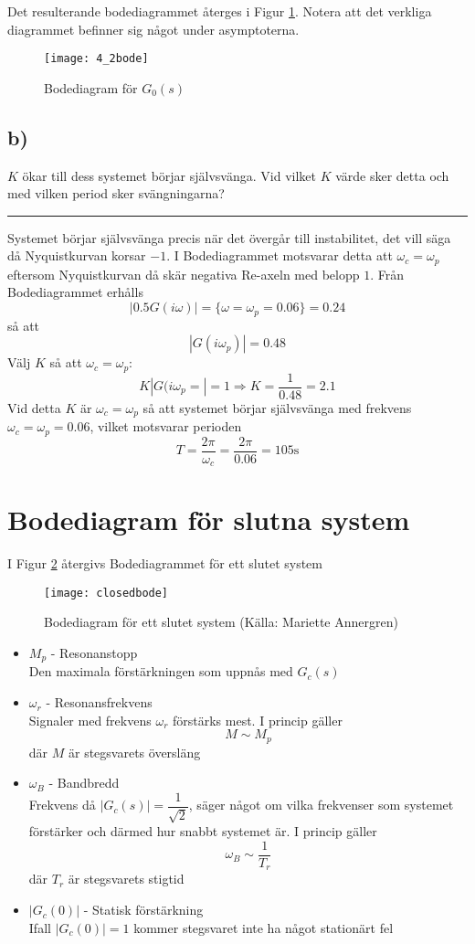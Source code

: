 \documentclass[12pt]{article}
\newcommand{\qline}{\hrule \vspace*{10pt}}
\begin{document}
\FloatBarrier
Det resulterande bodediagrammet återges i Figur \ref{fig:42bode}. Notera att det verkliga diagrammet befinner sig något under asymptoterna.
\begin{figure}[h!]
  \centering
  \texttt{[image: 4\_2bode]}
  \caption{Bodediagram för $G_0(s)$}
  \label{fig:42bode}
\end{figure}
\FloatBarrier

\subsection*{b)}
$K$ ökar till dess systemet börjar självsvänga. Vid vilket $K$ värde sker detta och med vilken period sker svängningarna?
\qline
Systemet börjar självsvänga precis när det övergår till instabilitet, det vill säga då Nyquistkurvan korsar $-1$. I Bodediagrammet motsvarar detta att $\omega_c = \omega_p$ eftersom Nyquistkurvan då skär negativa Re-axeln med belopp $1$. Från Bodediagrammet erhålls 
\[|0.5 G(i\omega)| = \lbrace \omega = \omega_p = 0.06 \rbrace = 0.24\]
så att 
\[|G(i\omega_p)| = 0.48\]
Välj $K$ så att $\omega_c = \omega_p$: 
\[K |G(i\omega_p= | = 1 \Rightarrow K = \frac{1}{0.48} = 2.1\]
Vid detta $K$ är $\omega_c = \omega_p$ så att systemet börjar självsvänga med frekvens $\omega_c = \omega_p = 0.06$, vilket motsvarar perioden 
\[T = \frac{2\pi}{\omega_c} = \frac{2\pi}{0.06} = 105 \mathrm{s}\]

\section*{Bodediagram för slutna system}
I Figur \ref{fig:closedbode} återgivs Bodediagrammet för ett slutet system
\begin{figure}[h!]
  \centering
  \texttt{[image: closedbode]}
  \caption{Bodediagram för ett slutet system (Källa: Mariette Annergren)}
  \label{fig:closedbode}
\end{figure}
\FloatBarrier

\begin{itemize}
\item $M_p$ - Resonanstopp \\
Den maximala förstärkningen som uppnås med $G_c(s)$
\item $\omega_r$ - Resonansfrekvens \\
Signaler med frekvens $\omega_r$ förstärks mest. I princip gäller 
\[M \sim M_p\]
där $M$ är stegsvarets översläng
\item $\omega_B$ - Bandbredd \\
  Frekvens då $|G_c(s)| = \dfrac{1}{\sqrt{2}}$, säger något om vilka frekvenser som systemet förstärker och därmed hur snabbt systemet är. I princip gäller 
  \[\omega_B \sim \frac{1}{T_r}\]
  där $T_r$ är stegsvarets stigtid
\item $|G_c(0)|$ - Statisk förstärkning \\
Ifall $|G_c(0)| = 1$ kommer stegsvaret inte ha något stationärt fel
\end{itemize}
\end{document}
